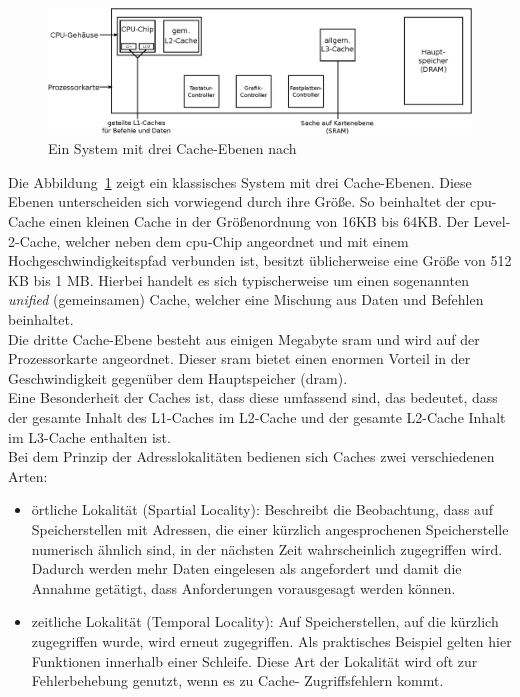 \begin{figure}[H]
\centering
\includegraphics[width=1\textwidth]{Hauptteil/Cache.eps}
\caption{Ein System mit drei Cache-Ebenen nach~\cite{cache}}\label{fig:cache}
\end{figure}





Die Abbildung~\ref{fig:cache} zeigt ein klassisches System mit drei Cache-Ebenen. Diese Ebenen unterscheiden sich vorwiegend durch ihre Größe. So beinhaltet der \ac{cpu}-Cache einen kleinen Cache
in der Größenordnung von 16KB bis 64KB. Der Level-2-Cache, welcher neben dem \ac{cpu}-Chip angeordnet und mit einem Hochgeschwindigkeitspfad verbunden ist, besitzt üblicherweise eine Größe von
 512 KB bis 1 MB. Hierbei handelt es sich typischerweise um einen sogenannten \emph{unified} (gemeinsamen) Cache, welcher eine Mischung aus Daten und Befehlen beinhaltet. \\
 Die dritte Cache-Ebene besteht aus einigen Megabyte \ac{sram} und wird auf der Prozessorkarte angeordnet. Dieser \ac{sram} bietet einen enormen Vorteil in der Geschwindigkeit gegenüber dem
 Hauptspeicher (\ac{dram}). \\
 Eine Besonderheit der Caches ist, dass diese umfassend sind, das bedeutet, dass der gesamte Inhalt des L1-Caches im L2-Cache und der gesamte L2-Cache Inhalt im L3-Cache  enthalten ist.\\
 \newpage
Bei dem Prinzip der Adresslokalitäten bedienen sich Caches zwei verschiedenen Arten:\\

\begin{itemize}
  \item örtliche Lokalität (Spartial Locality): Beschreibt die Beobachtung, dass auf Speicherstellen mit 	Adressen, die einer kürzlich angesprochenen Speicherstelle numerisch ähnlich sind, in der
   	nächsten Zeit wahrscheinlich zugegriffen wird. Dadurch werden mehr Daten eingelesen als 	angefordert und damit die Annahme getätigt, dass Anforderungen vorausgesagt werden 	können.
  \item zeitliche Lokalität (Temporal Locality): Auf Speicherstellen, auf die kürzlich zugegriffen wurde, 	wird erneut zugegriffen.  Als praktisches Beispiel gelten hier Funktionen innerhalb
        einer Schleife. Diese Art der Lokalität wird oft zur Fehlerbehebung genutzt,  wenn es zu Cache-	Zugriffsfehlern kommt.\\
\end{itemize}

